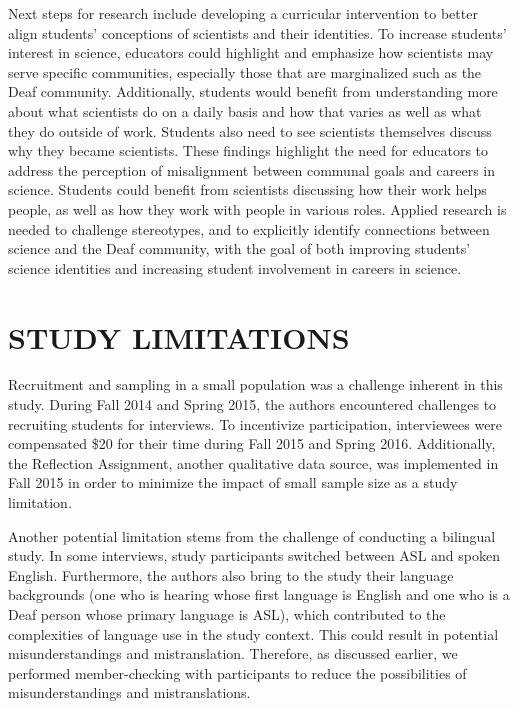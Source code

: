 \documentclass[11.5pt]{sig-alternate} %
\begin{document}
\begin{large}
Next steps for research include developing a curricular intervention to better align students’ conceptions of scientists and their identities. To increase students’ interest in science, educators could highlight and emphasize how scientists may serve specific communities, especially those that are marginalized such as the Deaf community. Additionally, students would benefit from understanding more about what scientists do on a daily basis and how that varies as well as what they do outside of work. Students also need to see scientists themselves discuss why they became scientists. These findings highlight the need for educators to address the perception of misalignment between communal goals and careers in science. Students could benefit from scientists discussing how their work helps people, as well as how they work with people in various roles. Applied research is needed to challenge stereotypes, and to explicitly identify connections between science and the Deaf community, with the goal of both improving students’ science identities and increasing student involvement in careers in science. 

\section*{STUDY LIMITATIONS}

Recruitment and sampling in a small population was a challenge inherent in this study. During Fall 2014 and Spring 2015, the authors encountered challenges to recruiting students for interviews. To incentivize participation, interviewees were compensated \$20 for their time during Fall 2015 and Spring 2016. Additionally, the Reflection Assignment, another qualitative data source, was implemented in Fall 2015 in order to minimize the impact of small sample size as a study limitation.

Another potential limitation stems from the challenge of conducting a bilingual study. In some interviews, study participants switched between ASL and spoken English. Furthermore, the authors also bring to the study their language backgrounds (one who is hearing whose first language is English and one who is a Deaf person whose primary language is ASL), which contributed to the complexities of language use in the study context. This could result in potential misunderstandings and mistranslation. Therefore, as discussed earlier, we performed member-checking with participants to reduce the possibilities of misunderstandings and mistranslations.  

\end{large}
\clearpage
\end{document}
